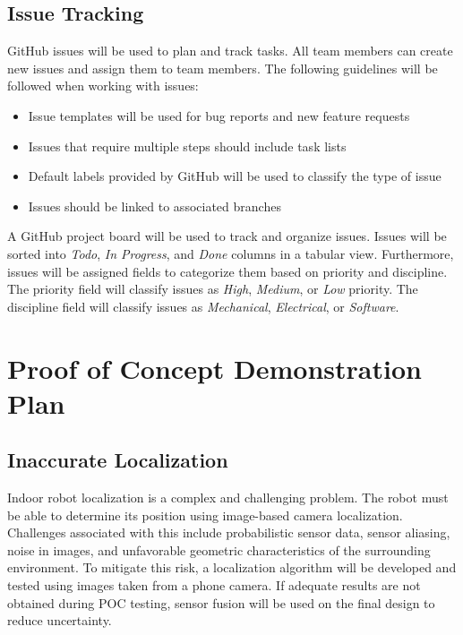 \documentclass[titlepage]{article}
\begin{document}
\subsection{Issue Tracking}

GitHub issues will be used to plan and track tasks. All team members can create new issues and assign them to team members. The following guidelines will be followed when working with issues:

\begin{itemize}
\item Issue templates will be used for bug reports and new feature requests
\item Issues that require multiple steps should include task lists
\item Default labels provided by GitHub will be used to classify the type of issue
\item Issues should be linked to associated branches
\end{itemize}

A GitHub project board will be used to track and organize issues. Issues will be sorted into \textit{Todo}, \textit{In Progress}, and \textit{Done} columns in a tabular view. Furthermore, issues will be assigned fields to categorize them based on priority and discipline. The priority field will classify issues as \textit{High}, \textit{Medium}, or \textit{Low} priority. The discipline field will classify issues as \textit{Mechanical}, \textit{Electrical}, or \textit{Software}.

\section{Proof of Concept Demonstration Plan}

\subsection{Inaccurate Localization}
Indoor robot localization is a complex and challenging problem. The robot must be able to determine its position using image-based camera localization. Challenges associated with this include probabilistic sensor data, sensor aliasing, noise in images, and unfavorable geometric characteristics of the surrounding environment. To mitigate this risk, a localization algorithm will be developed and tested using images taken from a phone camera. If adequate results are not obtained during POC testing, sensor fusion will be used on the final design to reduce uncertainty.
\end{document}

